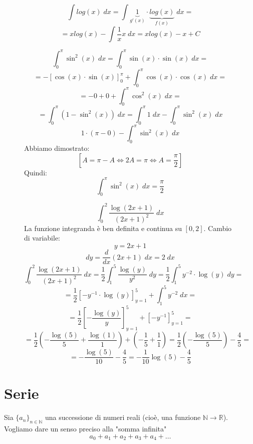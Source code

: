\documentclass[a4paper]{article}
\theoremstyle{break}
\theoremstyle{break}
\theoremstyle{break}
\theoremstyle{break}
\begin{document}
\begin{figure}[H]
  \begin{example}
    \[
      \int log(x)\;dx = \int \underbrace{1}_{g'(x)} \cdot \underbrace{log(x)}_{f(x)}\;dx =
    \] 
    \[
      = xlog(x) - \int \frac{1}{x} x \; dx = xlog(x) - x + C
    \] 
  \end{example}
\end{figure}

\begin{figure}[H]
  \begin{example}
    \[
      \int_{0}^{\pi } \sin^2(x)\;dx = \int_{0}^{\pi } \sin(x) \cdot \sin(x)\;dx =
    \] 
    \[
      = -\left[\cos(x) \cdot \sin(x) \right]_{0}^{\pi } + \int_{0}^{\pi } \cos(x) \cdot \cos(x)\;dx =
    \] 
    \[
      = -0 + 0 + \int_{0}^{\pi } \cos^2(x)\;dx = 
    \] 
    \[
      = \int_{0}^{\pi } (1 - \sin^2(x))\;dx = \int_{0}^{\pi } 1\;dx - \int_{0}^{\pi } \sin^2(x)\;dx
    \] 
    \[
      1 \cdot (\pi  - 0) - \int_{0}^{\pi } \sin^2(x)\;dx
    \] 
    Abbiamo dimostrato:
    \[
      \left[ A = \pi -A \Leftrightarrow 2A = \pi \Leftrightarrow A = \frac{\pi }{2} \right] 
    \] 
    Quindi:
    \[
      \int_{0}^{\pi } \sin^2(x)\;dx = \frac{\pi }{2}
    \] 
  \end{example}
\end{figure}

\begin{figure}[H]
  \begin{example}
    \[
      \int_{0}^{2} \frac{\log(2x+1)}{(2x+1)^2}\;dx
    \] 
    La funzione integranda è ben definita e continua su \( [0,2] \). Cambio di variabile:
    \[
      y = 2x+1
    \] 
    \[
      dy = \frac{d}{dx}(2x+1)\;dx = 2\;dx
    \] 
    \[
      \int_{0}^{2} \frac{\log(2x+1)}{(2x+1)^2}\;dx = \frac{1}{2} \int_{1}^{5} \frac{\log(y)}{y^2}\;dy = \frac{1}{2} \int_{1}^{5} y^{-2} \cdot \log(y) \;dy =
    \] 
    \[
      = \frac{1}{2} \left[ -y^{-1} \cdot \log(y) \right]_{y=1}^{5} + \int_{1}^{5} y^{-2}\;dx =
    \] 
    \[
      = \frac{1}{2} \left[ -\frac{\log(y)}{y} \right]_{y=1}^{5} + \left[ -y^{-1} \right]_{y=1}^{5} =
    \] 
    \[
      = \frac{1}{2} \left( -\frac{\log(5)}{5} + \frac{\log(1)}{1} \right) + \left( -\frac{1}{5} + \frac{1}{1} \right) = \frac{1}{2} \left( -\frac{\log(5)}{5} \right) - \frac{4}{5} =
    \] 
    \[
      = -\frac{\log(5)}{10} - \frac{4}{5} = -\frac{1}{10} \log(5) - \frac{4}{5} 
    \] 
  \end{example}
\end{figure}

\section{Serie}
Sia \( \{a_n\}_{n \in \mathbb{N}}  \) una successione di numeri reali (cioè, una funzione \( \mathbb{N} \to \mathbb{R} \)).
Vogliamo dare un senso preciso alla "somma infinita"
\[
  a_0 + a_1 + a_2 + a_3 + a_4 + \ldots
\] 
\end{document}
